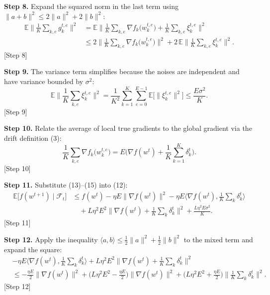 \documentclass{article}
\begin{document}
\noindent\textbf{Step 8.} Expand the squared norm in the last term using \(\|a+b\|^{2}\le 2\|a\|^{2}+2\|b\|^{2}\):
\[
\begin{aligned}
\mathbb{E}\!\Big\|\frac1K\sum_{k,e} g_{k}^{t,e}\Big\|^{2}
&= \mathbb{E}\!\Big\|\frac1K\sum_{k,e}\nabla f_k\!\big(w_{k}^{t,e}\big)
      +\frac1K\sum_{k,e}\xi_{k}^{t,e}\Big\|^{2} \\
&\le 2\Big\|\frac1K\sum_{k,e}\nabla f_k\!\big(w_{k}^{t,e}\big)\Big\|^{2}
      +2\,\mathbb{E}\!\Big\|\frac1K\sum_{k,e}\xi_{k}^{t,e}\Big\|^{2}.
\end{aligned}
\tag{13}
\] \hfill [Step 8]

\noindent\textbf{Step 9.} The variance term simplifies because the noises are independent and have variance bounded by \(\sigma^{2}\):
\[
\mathbb{E}\!\Big\|\frac1K\sum_{k,e}\xi_{k}^{t,e}\Big\|^{2}
   =\frac{1}{K^{2}}\sum_{k=1}^{K}\sum_{e=0}^{E-1}\mathbb{E}\!\big[\|\xi_{k}^{t,e}\|^{2}\big]
   \le \frac{E\sigma^{2}}{K}. \tag{14}
\] \hfill [Step 9]

\noindent\textbf{Step 10.} Relate the average of local true gradients to the global gradient via the drift definition (3):
\[
\frac1K\sum_{k,e}\nabla f_k\!\big(w_{k}^{t,e}\big)
   =E\Big(\nabla f(w^{t})+\frac1K\sum_{k=1}^{K}\delta_{k}^{t}\Big). \tag{15}
\] \hfill [Step 10]

\noindent\textbf{Step 11.} Substitute (13)–(15) into (12):
\[
\begin{aligned}
\mathbb{E}\!\big[f(w^{t+1})\mid\mathcal{F}_{t}\big]
&\le f(w^{t})
   -\eta E\Big\|\nabla f(w^{t})\Big\|^{2}
   -\eta E\Big\langle\nabla f(w^{t}),\frac1K\sum_{k}\delta_{k}^{t}\Big\rangle   \\
&\quad +L\eta^{2}E^{2}\Big\|\nabla f(w^{t})+\frac1K\sum_{k}\delta_{k}^{t}\Big\|^{2}
   +\frac{L\eta^{2}E\sigma^{2}}{K}.
\end{aligned}
\tag{16}
\] \hfill [Step 11]

\noindent\textbf{Step 12.} Apply the inequality \(\langle a,b\rangle\le \frac{1}{2}\|a\|^{2}+\frac{1}{2}\|b\|^{2}\) to the mixed term and expand the square:
\[
\begin{aligned}
&-\eta E\Big\langle\nabla f(w^{t}),\frac1K\sum_{k}\delta_{k}^{t}\Big\rangle
   +L\eta^{2}E^{2}\Big\|\nabla f(w^{t})+\frac1K\sum_{k}\delta_{k}^{t}\Big\|^{2}\\
&\le -\frac{\eta E}{2}\|\nabla f(w^{t})\|^{2}
      +\Big(L\eta^{2}E^{2}-\frac{\eta E}{2}\Big)\|\nabla f(w^{t})\|^{2}
      +\Big(L\eta^{2}E^{2}+\frac{\eta E}{2}\Big)\Big\|\frac1K\sum_{k}\delta_{k}^{t}\Big\|^{2}.
\end{aligned}
\tag{17}
\] \hfill [Step 12]
\end{document}
